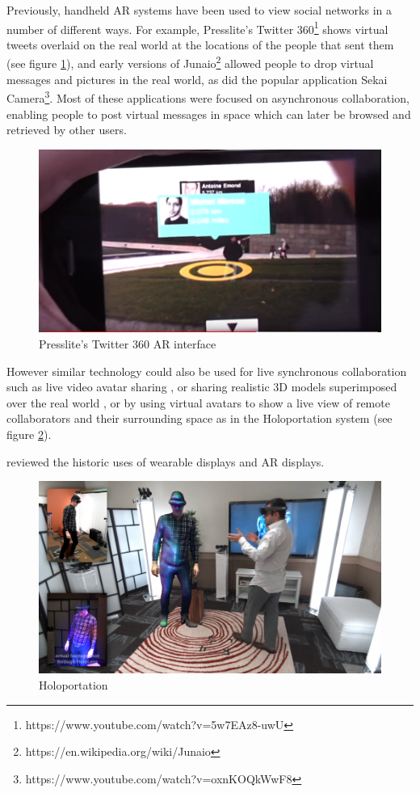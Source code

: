 Previously, handheld AR systems have been used to view social networks in a number of different ways. For example, Presslite's Twitter 360\footnote{https://www.youtube.com/watch?v=5w7EAz8-uwU} shows virtual tweets overlaid on the real world at the locations of the people that sent them (see figure \ref{fig:presslite}), and early versions of Junaio\footnote{https://en.wikipedia.org/wiki/Junaio} allowed people to drop virtual messages and pictures in the real world, as did the popular application Sekai Camera\footnote{https://www.youtube.com/watch?v=oxnKOQkWwF8}. Most of these applications were focused on asynchronous collaboration, enabling people to post virtual messages in space which can later be browsed and retrieved by other users. 

\begin{figure}
    \centering
    \includegraphics[width=.8\linewidth]{images/Presslite-twitter-360.PNG}
    \caption{Presslite's Twitter 360 AR interface}
    \label{fig:presslite}
\end{figure}

However similar technology could also be used for live synchronous collaboration such as live video avatar sharing  \cite{Billinghurst2002}, or sharing realistic 3D models superimposed over the real world \cite{Fanello2016}, or by using virtual avatars to show a live view of remote collaborators and their surrounding space as in the Holoportation system \cite{Fanello2016} (see figure \ref{fig:holoportation}).

\cite{Peddie2017} reviewed the historic uses of wearable displays and AR displays. 

\begin{figure}
    \centering
    \includegraphics[width=.8\linewidth]{images/holoportation.png}
    \caption{Holoportation}
    \label{fig:holoportation}
\end{figure}

